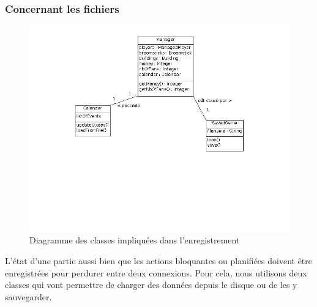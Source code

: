 \documentclass[a4paper,titlepage]{scrreprt}
\begin{document}
  \subsubsection{Concernant les fichiers}
    \begin{figure}[H]
    \center
    \includegraphics[scale=0.4]{uml/class/Fichiers.png}
    \caption{Diagramme des classes impliquées dans l'enregistrement}
    \end{figure}	
  L'état d'une partie aussi bien que les actions bloquantes ou planifiées doivent
  être enregistrées pour perdurer entre deux connexions. Pour cela, nous utilisons
  deux classes qui vont permettre de charger des données depuis le disque ou
  de les y sauvegarder.
\end{document}
